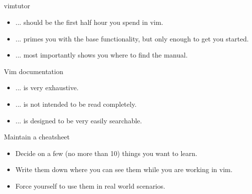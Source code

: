 \documentclass{beamer}
\begin{document}
    \subsection{}
    \begin{frame}{vimtutor}
        \begin{itemize}
            \item <alert@+> ... should be the first half hour you spend in vim.
            \item <alert@+> ... primes you with the base functionality, but only enough to get you started.
            \item <alert@+> ... most importantly shows you where to find the manual.
        \end{itemize}
    \end{frame}
    \begin{frame}{Vim documentation}
        \begin{itemize}
            \item <alert@+> ... is very exhaustive.
            \item <alert@+> ... is not intended to be read completely.  %
            \item <alert@+> ... is designed to be very easily searchable.
        \end{itemize}
    \end{frame}
    \begin{frame}{Maintain a cheatsheet}
        \begin{itemize}
            \item <alert@+> Decide on a few (no more than 10) things you want to learn.
            \item <alert@+> Write them down where you can see them while you are working in vim.
            \item <alert@+> Force yourself to use them in real world scenarios.
        \end{itemize}
    \end{frame}
\end{document}
